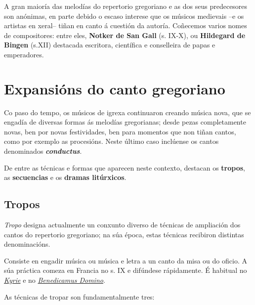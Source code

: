 \documentclass[spanish, a4paper,nobind]{templates/ociamthesis}
\begin{document}
A gran maioría das melodías do repertorio gregoriano e as dos seus predecesores son anónimas, en parte debido o escaso interese que os músicos medievais --e os artistas en xeral-- tiñan en canto á cuestión da autoría. Coñecemos varios nomes de compositores: entre eles, \textbf{Notker de San Gall} (s. IX-X), ou \textbf{Hildegard de Bingen} (s.XII) destacada escritora, científica e conselleira de papas e emperadores.

\hypertarget{expansiuxf3ns-do-canto-gregoriano}{%
\section*{Expansións do canto gregoriano}\label{expansiuxf3ns-do-canto-gregoriano}}

Co paso do tempo, os músicos de igrexa continuaron creando música nova, que se engadía de diversas formas ás melodías gregorianas; desde pezas completamente novas, ben por novas festividades, ben para momentos que non tiñan cantos, como por exemplo as procesións. Neste último caso inclúense os cantos denominados \textbf{\emph{conductus}}.

De entre as técnicas e formas que aparecen neste contexto, destacan os \textbf{tropos}, as \textbf{secuencias} e os \textbf{dramas litúrxicos}.

\hypertarget{tropos}{%
\subsection*{Tropos}\label{tropos}}

\emph{Tropo} designa actualmente un conxunto diverso de técnicas de ampliación dos cantos do repertorio gregoriano; na súa época, estas técnicas recibiron distintas denominacións.

Consiste en engadir música ou música e letra a un canto da misa ou do oficio. A súa práctica comeza en Francia no s. IX e difúndese rápidamente. É habitual no \href{https://open.spotify.com/track/0wTT2YyDjlqmjHe1HOIacE}{\emph{Kyrie}} e no \href{https://es.wikipedia.org/wiki/Benedicamus_domino}{\emph{Benedicamus Domino}}.

As técnicas de tropar son fundamentalmente tres:
\end{document}
